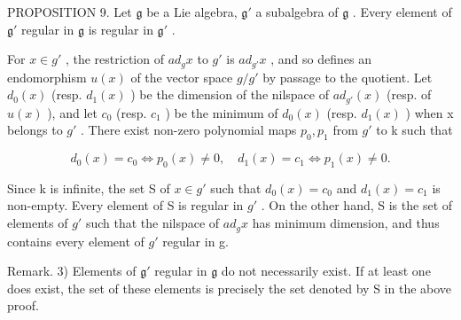 PROPOSITION 9. Let \(\mathfrak{g}\) be a Lie algebra, \(\mathfrak{g}'\) a subalgebra of \(\mathfrak{g}\) . Every element of \(\mathfrak{g}'\) regular in \(\mathfrak{g}\) is regular in \(\mathfrak{g}'\) .

For \(x \in g'\) , the restriction of \(ad_{g}x\) to \(g'\) is \(ad_{g'}x\) , and so defines an endomorphism \(u(x)\) of the vector space \(g/g'\) by passage to the quotient. Let \(d_{0}(x)\) (resp. \(d_{1}(x)\) ) be the dimension of the nilspace of \(ad_{g'}(x)\) (resp. of \(u(x)\) ), and let \(c_{0}\) (resp. \(c_{1}\) ) be the minimum of \(d_{0}(x)\) (resp. \(d_{1}(x)\) ) when x belongs to \(g'\) . There exist non-zero polynomial maps \(p_{0}, p_{1}\) from \(g'\) to k such that

\[
d _ {0} (x) = c _ {0} \Longleftrightarrow p _ {0} (x) \neq 0, \quad d _ {1} (x) = c _ {1} \Longleftrightarrow p _ {1} (x) \neq 0.
\]

Since k is infinite, the set S of \(x \in g'\) such that \(d_{0}(x) = c_{0}\) and \(d_{1}(x) = c_{1}\) is non-empty. Every element of S is regular in \(g'\) . On the other hand, S is the set of elements of \(g'\) such that the nilspace of \(ad_{g}x\) has minimum dimension, and thus contains every element of \(g'\) regular in g.

Remark. 3) Elements of \(\mathfrak{g}'\) regular in \(\mathfrak{g}\) do not necessarily exist. If at least one does exist, the set of these elements is precisely the set denoted by S in the above proof.

